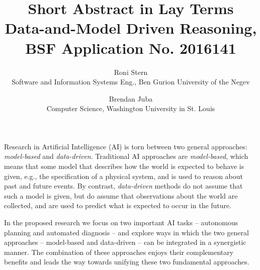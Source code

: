 \documentclass[12pt]{article}
\begin{document}
\title{Short Abstract in Lay Terms \\ \Large{Data-and-Model Driven Reasoning, BSF Application No. 2016141}}
\date{\vspace{-0.5cm}}
\author{Roni Stern \\ Software and Information Systems Eng., Ben Gurion University of the Negev
        \and Brendan Juba \\ Computer Science, Washington University in St. Louis}
\maketitle

Research in Artificial Intelligence (AI) is torn between two general approaches: {\em model-based} and {\em data-driven}. 
Traditional AI approaches are {\em model-based}, which means that some model that describes how the world is expected to behave is given, e.g., the specification of a physical system, and is used to reason about past and future events. By contrast, {\em data-driven} methods do not assume that such a model is given, but do assume that observations about the world are collected, and are used to predict what is expected to occur in the future. 


In the proposed research we focus on two important AI tasks -- autonomous planning and automated diagnosis -- and explore ways in which the two general approaches -- model-based and data-driven -- 
can be integrated in a synergistic manner. The combination of these approaches enjoys their complementary benefits and leads the way towards unifying these two fundamental approaches. 
\end{document}

